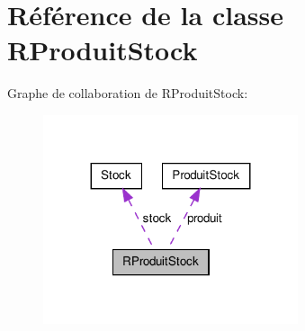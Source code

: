 \hypertarget{class_r_produit_stock}{
\section{Référence de la classe RProduitStock}
\label{d1/dbe/class_r_produit_stock}
}


Graphe de collaboration de RProduitStock:\nopagebreak
\begin{figure}[H]
\begin{center}
\leavevmode
\includegraphics[width=212pt]{de/ddb/class_r_produit_stock__coll__graph}
\end{center}
\end{figure}
